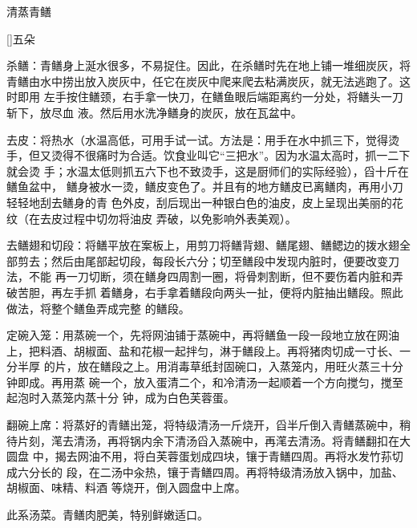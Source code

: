 \begin{recipe}{清蒸青鳝}

\ingredients

[\footnotemark]{五朵}

\preparation

\step 杀鳝：青鳝身上涎水很多，不易捉住。因此，在杀鳝时先在地上铺一堆细炭灰，将
青鳝由水中捞出放入炭灰中，任它在炭灰中爬来爬去粘满炭灰，就无法逃跑了。这时即用
左手按住鳝颈，右手拿一快刀，在鳝鱼眼后端距离约一分处，将鳝头一刀斩下，放尽血
液。然后用水洗净鳝身的炭灰，放在瓦盆中。

\step 去皮：将热水（水温高低，可用手试一试。方法是：用手在水中抓三下，觉得烫
手，但又烫得不很痛时为合适。饮食业叫它“三把水”。因为水温太高时，抓一二下就会烫
手；水温太低则抓五六下也不致烫手，这是厨师们的实际经验），舀十斤在鳝鱼盆中，
鳝身被水一烫，鳝皮变色了。并且有的地方鳝皮已离鳝肉，再用小刀轻轻地刮去鳝身的青
色外皮，刮后现出一种银白色的油皮，皮上呈现出美丽的花纹（在去皮过程中切勿将油皮
弄破，以免影响外表美观）。

\step 去鳝翅和切段：将鳝平放在案板上，用剪刀将鳝背翅、鳝尾翅、鳝鳃边的拨水翅全
部剪去；然后由尾部起切段，每段长六分；切至鳝段中发现内脏时，便要改变刀法，不能
再一刀切断，须在鳝身四周割一圈，将骨刺割断，但不要伤着内脏和弄破苦胆，再左手抓
着鳝身，右手拿着鳝段向两头一扯，便将内脏抽出鳝段。照此做法，将整个鳝鱼弄成完整
的鳝段。

\step 定碗入笼：用蒸碗一个，先将网油铺于蒸碗中，再将鳝鱼一段一段地立放在网油
上，把料酒、胡椒面、盐和花椒一起拌匀，淋于鳝段上。再将猪肉切成一寸长、一分半厚
的片，放在鳝段之上。用消毒草纸封固碗口，入蒸笼内，用旺火蒸三十分钟即成。再用蒸
碗一个，放入蛋清二个，和冷清汤一起顺着一个方向搅匀，搅至起泡时入蒸笼内蒸十分
钟，成为白色芙蓉蛋。

\step 翻碗上席：将蒸好的青鳝出笼，将特级清汤一斤烧开，舀半斤倒入青鳝蒸碗中，稍
待片刻，滗去清汤，再将锅内余下清汤舀入蒸碗中，再滗去清汤。将青鳝翻扣在大圆盘
中，揭去网油不用，将白芙蓉蛋划成四块，镶于青鳝四周。再将水发竹荪切成六分长的
段，在二汤中汆热，镶于青鳝四周。再将特级清汤放入锅中，加盐、胡椒面、味精、料酒
等烧开，倒入圆盘中上席。

\features

此系汤菜。青鳝肉肥美，特别鲜嫩适口。


\end{recipe}

